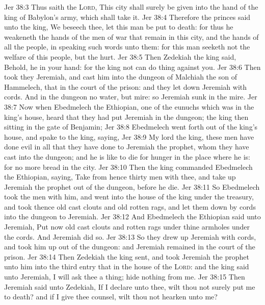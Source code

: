 \vs Jer 38:3 Thus saith the \textsc{Lord}, This city shall surely be given into the hand of the king of Babylon's army, which shall take it.
\vs Jer 38:4 Therefore the princes said unto the king, We beseech thee, let this man be put to death: for thus he weakeneth the hands of the men of war that remain in this city, and the hands of all the people, in speaking such words unto them: for this man seeketh not the welfare of this people, but the hurt.
\vs Jer 38:5 Then Zedekiah the king said, Behold, he  in your hand: for the king  not  can do  thing against you.
\vs Jer 38:6 Then took they Jeremiah, and cast him into the dungeon of Malchiah the son of Hammelech, that  in the court of the prison: and they let down Jeremiah with cords. And in the dungeon  no water, but mire: so Jeremiah sunk in the mire.
\vs Jer 38:7 Now when Ebedmelech the Ethiopian, one of the eunuchs which was in the king's house, heard that they had put Jeremiah in the dungeon; the king then sitting in the gate of Benjamin;
\vs Jer 38:8 Ebedmelech went forth out of the king's house, and spake to the king, saying,
\vs Jer 38:9 My lord the king, these men have done evil in all that they have done to Jeremiah the prophet, whom they have cast into the dungeon; and he is like to die for hunger in the place where he is: for  no more bread in the city.
\vs Jer 38:10 Then the king commanded Ebedmelech the Ethiopian, saying, Take from hence thirty men with thee, and take up Jeremiah the prophet out of the dungeon, before he die.
\vs Jer 38:11 So Ebedmelech took the men with him, and went into the house of the king under the treasury, and took thence old cast clouts and old rotten rags, and let them down by cords into the dungeon to Jeremiah.
\vs Jer 38:12 And Ebedmelech the Ethiopian said unto Jeremiah, Put now  old cast clouts and rotten rags under thine armholes under the cords. And Jeremiah did so.
\vs Jer 38:13 So they drew up Jeremiah with cords, and took him up out of the dungeon: and Jeremiah remained in the court of the prison.
\vs Jer 38:14 Then Zedekiah the king sent, and took Jeremiah the prophet unto him into the third entry that  in the house of the \textsc{Lord}: and the king said unto Jeremiah, I will ask thee a thing; hide nothing from me.
\vs Jer 38:15 Then Jeremiah said unto Zedekiah, If I declare  unto thee, wilt thou not surely put me to death? and if I give thee counsel, wilt thou not hearken unto me?
